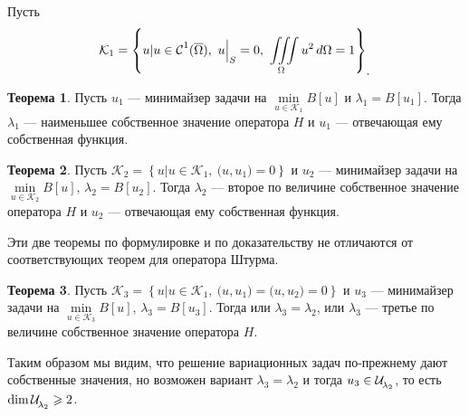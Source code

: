 \documentclass[12pt,a4paper,openany,fleqn]{book}
\newcommand{\Cf}{\ensuremath{\mathcal{C}}}
\newcommand{\mc}[1]{\ensuremath{\mathcal{#1}}}
\newcommand{\Cfn}[2][]{\ensuremath{\Cf{\mathstrut}^{#2}_{#1}}}
\newcommand{\K}{\mc{K}}
\newcommand{\Ul}[1][\lambda]{\ensuremath{\mc{U}\!{\mathstrut}_{#1}}}
\theoremstyle{definition}
\newtheorem{_teor}{Теорема}[section]
\begin{document}
	Пусть 
	\begin{equation*}
		\hfill\K_1=\left\{u|u\in\Cfn{1}(\overline{\Omega}),\ u\Big|_{S}=0,\ \iiint\limits_{\Omega}u^2\,d\Omega=1\right\}_{\displaystyle.}\hfill
	\end{equation*} 
	\begin{_teor}
		Пусть $u_1$ --- минимайзер задачи на $\displaystyle\min\limits_{u\in\K_1}B[u]$ и $\lambda_1=B[u_1]$. Тогда $\lambda_1$ --- наименьшее собственное значение оператора $H$ и $u_1$ --- отвечающая ему собственная функция.
	\end{_teor}
	\begin{_teor}
		Пусть $\K_2=\left\{u|u\in\K_1,\ \big(u,u_1\big)=0\right\}$ и $u_2$ --- минимайзер задачи на $\displaystyle\min\limits_{u\in\K_2}B[u]$, $\lambda_2=B[u_2]$. Тогда $\lambda_2$ --- второе по величине собственное значение оператора $H$ и $u_2$ --- отвечающая ему собственная функция.
	\end{_teor}
	Эти две теоремы по формулировке и по доказательству не отличаются от соответствующих теорем для оператора Штурма.
	\begin{_teor}
		Пусть $\K_3=\left\{u|u\in\K_1,\ \big(u,u_1\big)=\big(u,u_2\big)=0\right\}$ и $u_3$ --- минимайзер задачи на $\displaystyle\min\limits_{u\in\K_3}B[u]$, $\lambda_3=B[u_3]$. Тогда или $\lambda_3=\lambda_2$, или $\lambda_3$ --- третье по величине собственное значение оператора $H$. 
	\end{_teor}
	Таким образом мы видим, что решение вариационных задач по-прежнему дают собственные значения, но возможен вариант $\lambda_3=\lambda_2$ и тогда $u_3\in\Ul[\lambda_2]$, то есть $\dim\Ul[\lambda_2]\geqslant2$.
	
\end{document}
